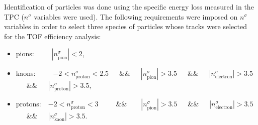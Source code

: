 Identification of particles was done using the specific energy loss measured in the TPC ($n^{\sigma}$ variables were used). The following requirements were imposed on $n^{\sigma}$ variables in order to select three species of particles whose tracks were selected for the TOF efficiency analysis:
\begin{itemize}
 \item pions:~~~~~$|n^{\sigma}_{\text{pion}}| < 2$,
 \item kaons:~~~~~$-2 < n^{\sigma}_{\text{proton}} < 2.5$~~~\&\&~~~$|n^{\sigma}_{\text{pion}}| > 3.5$~~~\&\&~~~$|n^{\sigma}_{\text{electron}}| > 3.5$~~~\&\&~~~$|n^{\sigma}_{\text{proton}}| > 3.5$,
 \item protons:~~$-2 < n^{\sigma}_{\text{proton}} < 3$~~~~~\&\&~~~~$|n^{\sigma}_{\text{pion}}| > 3.5$~~~\&\&~~~$|n^{\sigma}_{\text{electron}}| > 3.5$~~~\&\&~~~$|n^{\sigma}_{\text{kaon}}| > 3.5$.
\end{itemize}

